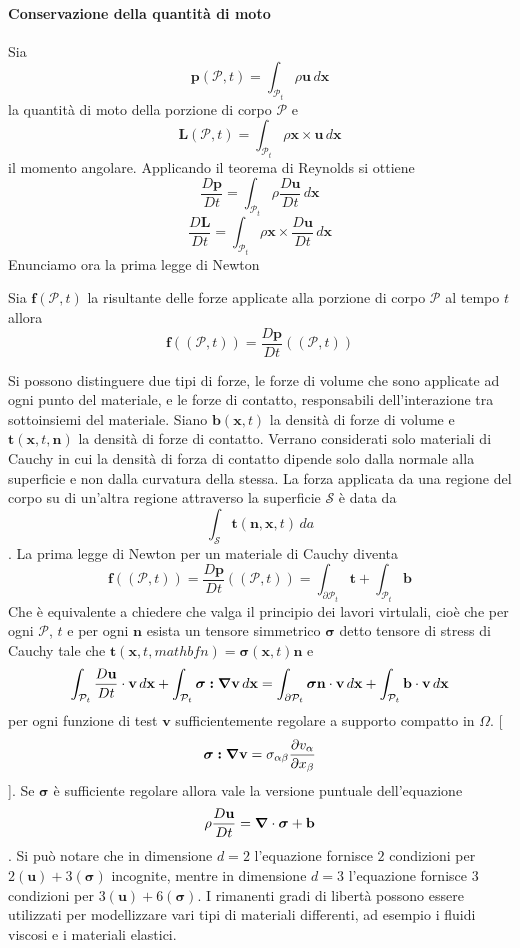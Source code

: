 \paragraph{Conservazione della quantità di moto}
Sia
$$\mathbf{p}(\mathcal{P},t)=\int_{\mathcal{P}_t}\rho\mathbf{u}\,d\mathbf{x}$$
la quantità di moto della porzione di corpo $\mathcal{P}$
e
$$\mathbf{L}(\mathcal{P},t)=\int_{\mathcal{P}_t}\rho\mathbf{x}\times\mathbf{u}\,d\mathbf{x}$$
il momento angolare.
Applicando il teorema di Reynolds si ottiene
$$\frac{D\mathbf{p}}{Dt}=\int_{\mathcal{P}_t}\rho\frac{D\mathbf{u}}{Dt}\,d\mathbf{x}$$
$$\frac{D\mathbf{L}}{Dt}=\int_{\mathcal{P}_t}\rho\mathbf{x}\times\frac{D\mathbf{u}}{Dt}\,d\mathbf{x}$$
Enunciamo ora la prima legge di Newton
\begin{theorem}
	Sia $\mathbf{f}(\mathcal{P},t)$ la risultante delle forze applicate alla porzione di corpo $\mathcal{P}$ al tempo $t$ allora
	$$\mathbf{f}((\mathcal{P},t))=\frac{D\mathbf{p}}{Dt}((\mathcal{P},t))$$
\end{theorem}
Si possono distinguere due tipi di forze, le forze di volume che sono applicate ad ogni punto del materiale, e le forze di contatto, responsabili dell'interazione tra sottoinsiemi del materiale.
Siano $\mathbf{b}(\mathbf{x},t)$ la densità di forze di volume e $\mathbf{t}(\mathbf{x},t,\mathbf{n})$ la densità di forze di contatto. Verrano considerati solo materiali di Cauchy in cui la densità di forza di contatto dipende solo dalla normale alla superficie e non dalla curvatura della stessa.
La forza applicata da una regione del corpo su di un'altra regione attraverso la superficie $\mathcal{S}$ è data da
$$\int_{\mathcal{S}}\mathbf{t}(\mathbf{n},\mathbf{x},t)\,da$$.
La prima legge di Newton per un materiale di Cauchy diventa
$$\mathbf{f}((\mathcal{P},t))=\frac{D\mathbf{p}}{Dt}((\mathcal{P},t)) = \int_{\partial\mathcal{P}_t}\mathbf{t}+\int_{\mathcal{P}_t}\mathbf{b}$$
Che è equivalente a chiedere che valga il principio dei lavori virtulali, cioè che per ogni $\mathcal{P}$, $t$ e per ogni $\mathbf{n}$ esista un tensore simmetrico $\boldsymbol{\sigma}$ detto tensore di stress di Cauchy tale che $\mathbf{t}(\mathbf{x},t,mathbf{n})=\boldsymbol{\sigma}(\mathbf{x},t)\mathbf{n}$ e
$$\int_{\mathcal{P}_t}\frac{D\mathbf{u}}{Dt}\cdot\mathbf{v}\,d\mathbf{x}+\int_{\mathcal{P}_t}\boldsymbol{\sigma}\boldsymbol{:}\boldsymbol{\nabla}\mathbf{v}\,d\mathbf{x}=\int_{\partial\mathcal{P}_t}\boldsymbol{\sigma}\mathbf{n}\cdot\mathbf{v}\,d\mathbf{x}+\int_{\mathcal{P}_t}\mathbf{b}\cdot\mathbf{v}\,d\mathbf{x}$$
per ogni funzione di test $\mathbf{v}$ sufficientemente regolare a supporto compatto in $\Omega$.
[$$\boldsymbol{\sigma}\boldsymbol{:}\boldsymbol{\nabla}\mathbf{v}=\sigma_{\alpha\beta}\frac{\partial v_{\alpha}}{\partial x_{\beta}}$$].
Se $\boldsymbol{\sigma}$ è sufficiente regolare allora vale la versione puntuale dell'equazione
$$\rho\frac{D\mathbf{u}}{Dt}=\boldsymbol{\nabla}\cdot\boldsymbol{\sigma}+\mathbf{b}$$.
Si può notare che in dimensione $d=2$ l'equazione fornisce $2$ condizioni per $2(\mathbf{u})+3(\boldsymbol{\sigma})$ incognite, mentre in dimensione $d=3$ l'equazione fornisce $3$ condizioni per $3(\mathbf{u})+6(\boldsymbol{\sigma})$.
I rimanenti gradi di libertà possono essere utilizzati per modellizzare vari tipi di materiali differenti, ad esempio i fluidi viscosi e i materiali elastici.

